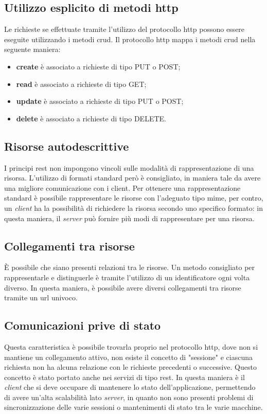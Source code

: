 \subsection{Utilizzo esplicito di metodi \gls{http}}
Le richieste se effettuate tramite l'utilizzo del protocollo \gls{http} possono
essere eseguite utilizzando i metodi \gls{crud}. Il protocollo \gls{http}
mappa i metodi \gls{crud} nella seguente maniera:
\begin{itemize}
  \item \textbf{create} è associato a richieste di tipo PUT o POST;
  \item \textbf{read} è associato a richieste di tipo GET;
  \item \textbf{update} è associato a richieste di tipo PUT o POST;
  \item \textbf{delete} è associato a richieste di tipo DELETE.
\end{itemize}

\subsection{Risorse autodescrittive}
I principi \gls{rest} non impongono vincoli sulle modalità di rappresentazione
di una risorsa. L'utilizzo di formati standard però è consigliato, in maniera
tale da avere una migliore comunicazione con i client. Per ottenere una
rappresentazione standard è possibile rappresentare le risorse con l'adeguato
tipo \gls{mime}, per contro, un \textit{client} ha la possibilità di richiedere
la risorsa secondo uno specifico formato: in questa maniera, il \textit{server}
può fornire più modi di rappresentare per una risorsa.

\subsection{Collegamenti tra risorse}
È possibile che siano presenti relazioni tra le risorse. Un metodo consigliato
per rappresentarle e distinguerle è tramite l'utilizzo di un identificatore
ogni volta diverso.
In questa maniera, è possibile avere diversi collegamenti tra risorse tramite
un \gls{url} univoco.

\subsection{Comunicazioni prive di stato}
Questa caratteristica è possibile trovarla proprio nel protocollo \gls{http},
dove non si mantiene un collegamento attivo, non esiste il concetto di
"sessione" e ciascuna richiesta non ha alcuna relazione con le richieste
precedenti o successive. Questo concetto è stato portato anche nei servizi di
tipo \gls{rest}.
In questa maniera è il \textit{client} che si deve occupare di mantenere lo
stato dell'applicazione, permettendo di avere un'alta scalabilità lato
\textit{server}, in quanto non sono presenti problemi di sincronizzazione delle
varie sessioni o mantenimenti di stato tra le varie macchine.
